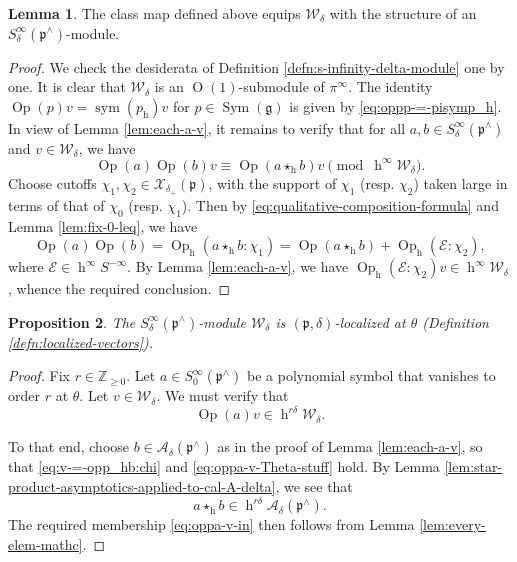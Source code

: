 \documentclass[reqno]{amsart}
\DeclareMathOperator{\h}{h}
\DeclareMathOperator{\Sym}{Sym}
\def\O{\operatorname{O}}
\DeclareMathOperator{\Opp}{Op}
\DeclareMathOperator{\sym}{sym}
\theoremstyle{plain} \newtheorem{theorem} {Theorem}
\newtheorem{proposition} [theorem] {Proposition}
\theoremstyle{definition} \newtheorem{definition} [theorem] {Definition}
\theoremstyle{itplain} %
\newtheorem{lemma}[theorem]{Lemma}
\numberwithin{equation}{section}
\numberwithin{theorem}{section}
\renewcommand{\geq}{\geqslant}
\begin{document}
\begin{lemma}\label{lem:class-map-defined-cal-W-delta-module}
  The class map defined above equips $\mathcal{W}_\delta$ with the structure of an $S_\delta^\infty(\mathfrak{p}^\wedge)$-module.
\end{lemma}
\begin{proof}
  We check the desiderata of Definition \ref{defn:s-infinity-delta-module} one by one.  It is clear that $\mathcal{W}_\delta$ is an $\O(1)$-submodule of $\pi^\infty$.  The identity $\Opp(p) v = \sym(p_{\h}) v$ for $p \in \Sym(\mathfrak{g})$ is given by \eqref{eq:oppp-=-pisymp_h}.  In view of Lemma \ref{lem:each-a-v}, it remains to verify that for all $a,b \in S^\infty_\delta(\mathfrak{p}^\wedge)$ and $v \in \mathcal{W}_\delta$, we have
  \begin{equation*}
    \Opp(a) \Opp(b) v \equiv \Opp(a \star_{\h} b) v \pmod{\h^\infty \mathcal{W}_\delta}.
  \end{equation*}
  Choose cutoffs $\chi_1, \chi_2 \in \mathcal{X}_{\delta_+}(\mathfrak{p})$, with the support of $\chi_1$ (resp. $\chi_2$) taken large in terms of that of $\chi_0$ (resp. $\chi_1$).  Then by
  \eqref{eq:qualitative-composition-formula} and Lemma \ref{lem:fix-0-leq}, we have
  \begin{equation*}
    \Opp(a) \Opp(b) = \Opp_{\h}(a \star_{\h} b: \chi_1) = \Opp(a \star_{\h} b) + \Opp_{\h}(\mathcal{E}:\chi_2),
  \end{equation*}
  where $\mathcal{E} \in \h^\infty S^{-\infty}$.  By Lemma \ref{lem:each-a-v}, we have $\Opp_{\h}(\mathcal{E}:\chi_2) v \in \h^\infty \mathcal{W}_\delta$, whence the required conclusion.
\end{proof}

\begin{proposition}\label{prop:local-with-resp-p}
  The $S^\infty_\delta(\mathfrak{p}^\wedge)$-module $\mathcal{W}_\delta$ is $(\mathfrak{p},\delta)$-localized at $\theta$ (Definition \ref{defn:localized-vectors}).
\end{proposition}
\begin{proof}
  Fix $r \in \mathbb{Z}_{\geq 0}$.  Let $a \in S^\infty_0(\mathfrak{p}^\wedge)$ be a polynomial symbol that vanishes to order $r$ at $\theta$.  Let $v \in \mathcal{W}_\delta$.  We must verify that
  \begin{equation}\label{eq:oppa-v-in}
    \Opp(a) v \in \h^{r \delta} \mathcal{W}_\delta.
  \end{equation}

  To that end, choose $b \in \mathcal{A}_\delta(\mathfrak{p}^\wedge)$ as in the proof of Lemma \ref{lem:each-a-v}, so that \eqref{eq:v-=-opp_hb:chi} and \eqref{eq:oppa-v-Theta-stuff} hold.  By Lemma \ref{lem:star-product-asymptotics-applied-to-cal-A-delta}, we see that
  \begin{equation*}
    a \star_{\h} b \in \h^{r \delta} \mathcal{A}_\delta(\mathfrak{p}^\wedge).
  \end{equation*}
  The required membership \eqref{eq:oppa-v-in} then follows from Lemma \ref{lem:every-elem-mathc}.
\end{proof}
\end{document}
